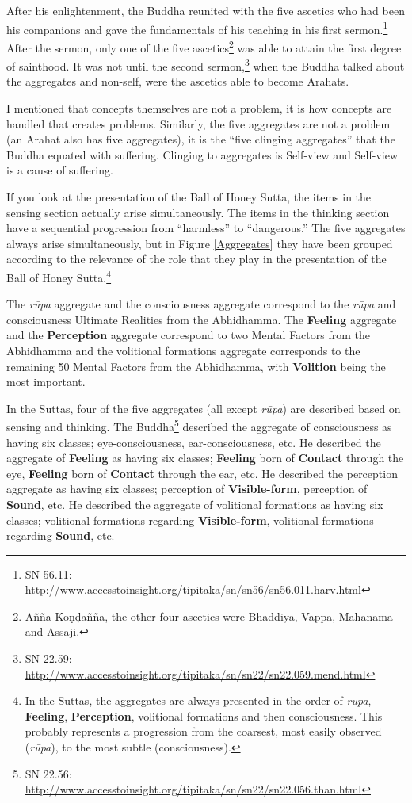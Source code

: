 After his enlightenment, the Buddha reunited with the five ascetics who had been his companions and gave the fundamentals of his teaching in his first sermon.\footnote{SN 56.11: \url{http://www.accesstoinsight.org/tipitaka/sn/sn56/sn56.011.harv.html}} After the sermon, only one of the five ascetics\footnote{Añña-Koṇḍañña, the other four ascetics were Bhaddiya, Vappa, Mahānāma and Assaji.} was able to attain the first degree of sainthood. It was not until the second sermon,\footnote{SN 22.59: \url{http://www.accesstoinsight.org/tipitaka/sn/sn22/sn22.059.mend.html}} when the Buddha talked about the aggregates and non-self, were the ascetics able to become Arahats.

I mentioned that concepts themselves are not a problem, it is how concepts are handled that creates problems. Similarly, the five aggregates are not a problem (an Arahat also has five aggregates), it is the “five clinging aggregates” that the Buddha equated with suffering. Clinging to aggregates is Self-view and Self-view is a cause of suffering.

If you look at the presentation of the Ball of Honey Sutta, the items in the sensing section actually arise simultaneously. The items in the thinking section have a sequential progression from “harmless” to “dangerous.” The five aggregates always arise simultaneously, but in Figure \ref{Aggregates} they have been grouped according to the relevance of the role that they play in the presentation of the Ball of Honey Sutta.\footnote{In the Suttas, the aggregates are always presented in the order of \textit{rūpa}, \textbf{Feeling}, \textbf{Perception}, volitional formations and then consciousness. This probably represents a progression from the coarsest, most easily observed (\textit{rūpa}), to the most subtle (consciousness).}

The \textit{rūpa} aggregate and the consciousness aggregate correspond to the \textit{rūpa} and consciousness Ultimate Realities from the Abhidhamma. The \textbf{Feeling} aggregate and the \textbf{Perception} aggregate correspond to two Mental Factors from the Abhidhamma and the volitional formations aggregate corresponds to the remaining 50 Mental Factors from the Abhidhamma, with \textbf{Volition} being the most important.

In the Suttas, four of the five aggregates (all except \textit{rūpa}) are described based on sensing and thinking. The Buddha\footnote{SN 22.56: \url{http://www.accesstoinsight.org/tipitaka/sn/sn22/sn22.056.than.html}} described the aggregate of consciousness as having six classes; eye-consciousness, ear-consciousness, etc. He described the aggregate of \textbf{Feeling} as having six classes; \textbf{Feeling} born of \textbf{Contact} through the eye, \textbf{Feeling} born of \textbf{Contact} through the ear, etc. He described the perception aggregate as having six classes; perception of \textbf{Visible-form}, perception of \textbf{Sound}, etc. He described the aggregate of volitional formations as having six classes; volitional formations regarding \textbf{Visible-form}, volitional formations regarding \textbf{Sound}, etc.

